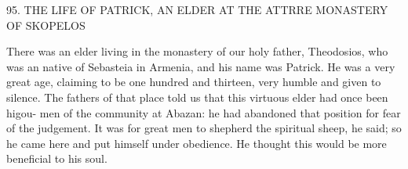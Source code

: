 95.
THE LIFE OF PATRICK, AN ELDER AT THE
ATTRRE MONASTERY OF SKOPELOS

There was an elder living in the monastery of our holy father,
Theodosios, who was an native of Sebasteia in Armenia, and his
name was Patrick.
He was a very great age, claiming to be one
hundred and thirteen, very humble and given to silence.
The fathers
of that place told us that this virtuous elder had once been higou-
men of the community at Abazan: he had abandoned that position
for fear of the judgement.
It was for great men to shepherd the
spiritual sheep, he said; so he came here and put himself under
obedience.
He thought this would be more beneficial to his soul.

